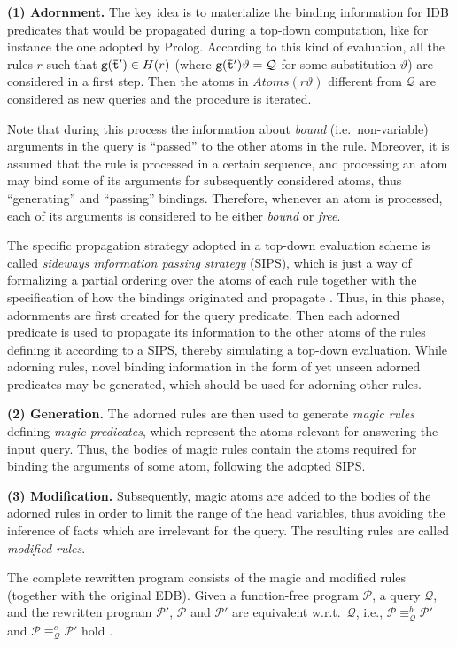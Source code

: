 \documentclass{tlp}
\newcommand{\R}{\ensuremath{r}}
\newcommand{\HR}{\ensuremath{H(\R)}}
\newcommand{\atoms}[1]{\ensuremath{Atoms(#1)}}
\renewcommand{\P}{\mathcal{P}}
\newcommand{\Q}{\mathcal{Q}}
\newcommand{\qrelation}[3]{\ensuremath{{#1}_{#2}^{#3}}}
\newcommand{\qequiv}[2]{\ensuremath{\qrelation{\equiv}{#1}{#2}}}
\newcommand{\bqequiv}[1]{\ensuremath{\qequiv{#1}{b}}}
\newcommand{\cqequiv}[1]{\ensuremath{\qequiv{#1}{c}}}
\renewcommand{\t}{\bar t}
\begin{document}
\noindent
\textbf{(1) Adornment.} The key idea is to materialize the binding information for IDB predicates that would be
propagated during a top-down computation,
like for instance the one adopted by Prolog. According to this kind of evaluation, 
all the rules $\R$ such that ${\tt g(\t')} \in \HR$ (where ${\tt g(\t')}\vartheta = \Q$ for some
substitution $\vartheta$) 
are considered in a first step. Then the atoms in $\atoms{\R\vartheta}$ 
different from $\Q$ are considered as new queries and the procedure is iterated.

Note that during this process the information about \emph{bound}
(i.e.\ non-variable) arguments in the query is ``passed'' to the other
atoms in the rule. Moreover, it is assumed that the rule is processed in
a certain sequence, and processing an atom may bind some of its
arguments for subsequently considered atoms, thus ``generating'' and
``passing'' bindings.  Therefore, whenever an atom is processed, each
of its arguments is considered to be either \emph{bound} or
\emph{free}.

The specific propagation strategy adopted in a top-down evaluation scheme is called {\em sideways information
passing strategy} (SIPS), which is just a way of formalizing a partial ordering over the atoms of each rule
together with the specification of how the bindings originated and propagate
\cite{beer-rama-91,grec-2003}.
Thus, in this phase, adornments are first created for the query predicate.
Then each adorned predicate is used to propagate its information to the other atoms of the rules defining it
according to a SIPS, thereby simulating a top-down evaluation. 
While adorning rules, novel binding information in the form of yet unseen adorned predicates may be generated, which should be used
for adorning other rules.

\noindent
\textbf{(2) Generation.} The adorned rules are then used to generate
{\em magic rules} defining {\em magic predicates}, which represent the atoms relevant for answering the input query.
Thus, the bodies of magic rules contain the atoms required for binding
the arguments of some atom, following the adopted SIPS.

\noindent
\textbf{(3) Modification.} Subsequently, magic atoms are added to the bodies of the adorned rules in order to
 limit the range of the head variables, thus avoiding the inference of facts which are irrelevant for the query. The resulting rules are called {\em modified rules}.

The complete rewritten program consists of the magic and modified rules
(together with the original EDB).  Given a function-free program $\P$, a 
query $\Q$, and the rewritten program $\P'$, $\P$
and $\P'$ are equivalent w.r.t.\ $\Q$, i.e., $\P\bqequiv{\Q} {\P'}$ and $\P\cqequiv{\Q} {\P'}$ hold
\cite{alvi-etal-2009-TR}.
\end{document}
